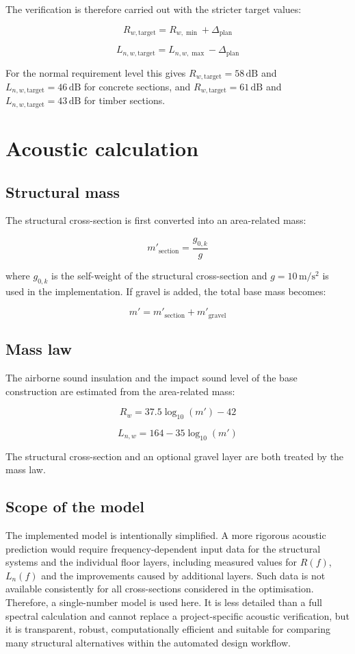 \documentclass[9pt,a4paper,twocolumn,twoside]{rho-class/rho}
\begin{document}
\noindent The verification is therefore carried out with the stricter target values:

\[
    R_{w,\mathrm{target}} = R_{w,\min} + \Delta_{\mathrm{plan}}
\]

\[
    L_{n,w,\mathrm{target}} = L_{n,w,\max} - \Delta_{\mathrm{plan}}
\]

\noindent For the normal requirement level this gives $R_{w,\mathrm{target}}=58\,\mathrm{dB}$ and $L_{n,w,\mathrm{target}}=46\,\mathrm{dB}$ for concrete sections, and $R_{w,\mathrm{target}}=61\,\mathrm{dB}$ and $L_{n,w,\mathrm{target}}=43\,\mathrm{dB}$ for timber sections.

\section{Acoustic calculation}

\subsection{Structural mass}

The structural cross-section is first converted into an area-related mass:

\[
    m'_{\mathrm{section}}=\frac{g_{0,k}}{g}
\]

\noindent where $g_{0,k}$ is the self-weight of the structural cross-section and $g=10\,\mathrm{m/s^2}$ is used in the implementation. If gravel is added, the total base mass becomes:

\[
    m' = m'_{\mathrm{section}} + m'_{\mathrm{gravel}}
\]

\subsection{Mass law}

The airborne sound insulation and the impact sound level of the base construction are estimated from the area-related mass:

\[
    R_w = 37.5 \log_{10}(m') - 42
\]

\[
    L_{n,w} = 164 - 35 \log_{10}(m')
\]

\noindent The structural cross-section and an optional gravel layer are both treated by the mass law.

\subsection{Scope of the model}

The implemented model is intentionally simplified. A more rigorous acoustic prediction would require frequency-dependent input data for the structural systems and the individual floor layers, including measured values for $R(f)$, $L_n(f)$ and the improvements caused by additional layers. Such data is not available consistently for all cross-sections considered in the optimisation. Therefore, a single-number model is used here. It is less detailed than a full spectral calculation and cannot replace a project-specific acoustic verification, but it is transparent, robust, computationally efficient and suitable for comparing many structural alternatives within the automated design workflow.
\end{document}
